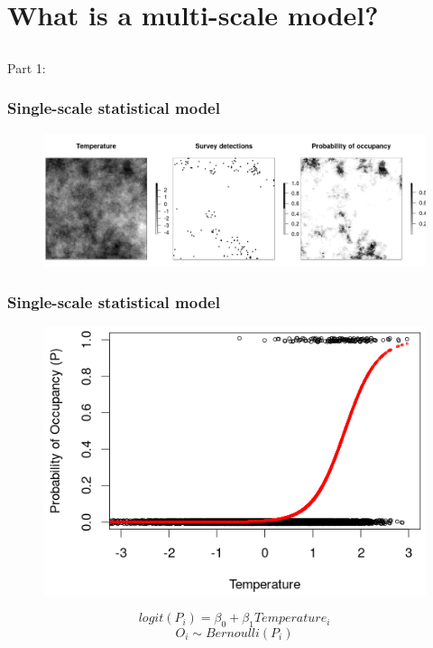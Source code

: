 \documentclass[xcolor=x11names, compress]{beamer}
\renewcommand{\(}{\begin{columns}}
\renewcommand{\)}{\end{columns}}
\newcommand{\<}[1]{\begin{column}{#1}}
\renewcommand{\>}{\end{column}}
\begin{document}
\section{What is a multi-scale model?}
\subsection{}
\begin{frame}
	\Large{Part 1: \insertsection}
\end{frame}

\begin{frame}
\frametitle{Single-scale statistical model}
\begin{figure}
	\includegraphics[width=1\linewidth]{fig/maps_single.png}
\end{figure}

\end{frame}


\begin{frame}
\frametitle{Single-scale statistical model}
\begin{figure}
	\includegraphics[width=0.7\linewidth]{fig/logistic.png}
\end{figure}
\begin{equation}
	logit (P_{i}) = \beta_0 + \beta_1 Temperature_{i}
\end{equation}
\begin{equation}
	O_i \sim Bernoulli(P_i)
\end{equation}

\end{frame}
\end{document}
